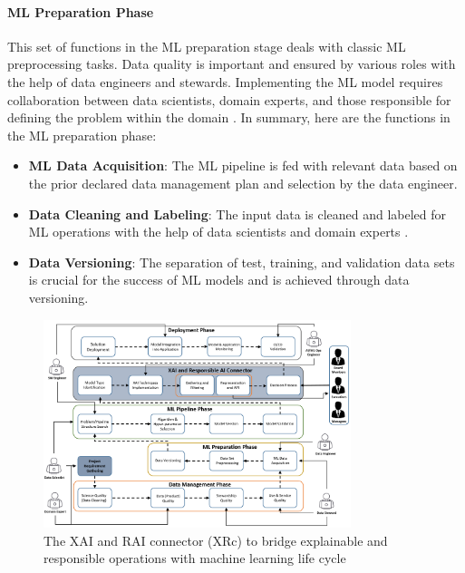 \documentclass[conference]{IEEEtran}
\begin{document}
\paragraph{ML Preparation Phase} This set of functions in the ML preparation stage deals with classic ML preprocessing tasks. Data quality is important and ensured by various roles with the help of data engineers and stewards. Implementing the ML model requires collaboration between data scientists, domain experts, and those responsible for defining the problem within the domain \cite{treveil2020introducing}. In summary, here are the functions in the ML preparation phase:
\begin{itemize}
	\item \textbf{ML Data Acquisition}: The ML pipeline is fed with relevant data based on the prior declared data management plan and selection by the data engineer.
	\item \textbf{Data Cleaning and Labeling}: The input data is cleaned and labeled for ML operations with the help of data scientists and domain experts \cite{taleb2018big}.
	\item \textbf{Data Versioning}: The separation of test, training, and validation data sets is crucial for the success of ML models and is achieved through data versioning.
\end{itemize}

\begin{figure}[h!]
	\centering
	\includegraphics[width=0.8\textwidth]{ML-OPS_with_XAI.png}
	\caption{The XAI and RAI connector (XRc) to bridge explainable and responsible operations with machine learning life cycle}
	\label{XRc-phase}
\end{figure}
\end{document}
